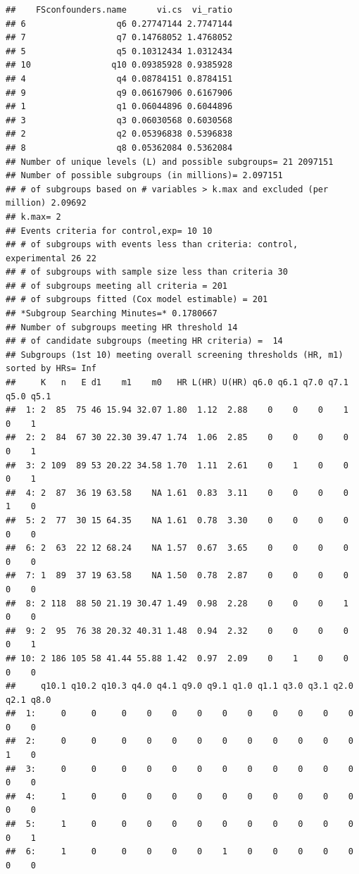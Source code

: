 \documentclass[smallextended]{svjour3}
\makeatletter
\newenvironment{kframe}{%
 \def\at@end@of@kframe{}%
 \ifinner\ifhmode%
  \def\at@end@of@kframe{\end{minipage}}%
  \begin{minipage}{\columnwidth}%
 \fi\fi%
 \def\FrameCommand##1{\hskip\@totalleftmargin \hskip-\fboxsep
 \colorbox{shadecolor}{##1}\hskip-\fboxsep
     \hskip-\linewidth \hskip-\@totalleftmargin \hskip\columnwidth}%
 \MakeFramed {\advance\hsize-\width
   \@totalleftmargin\z@ \linewidth\hsize
   \@setminipage}}%
 {\par\unskip\endMakeFramed%
 \at@end@of@kframe}
\newenvironment{knitrout}{}{} %
\makeatother
\begin{document}
\begin{knitrout}
\begin{kframe}
\begin{verbatim}
##    FSconfounders.name      vi.cs  vi_ratio
## 6                  q6 0.27747144 2.7747144
## 7                  q7 0.14768052 1.4768052
## 5                  q5 0.10312434 1.0312434
## 10                q10 0.09385928 0.9385928
## 4                  q4 0.08784151 0.8784151
## 9                  q9 0.06167906 0.6167906
## 1                  q1 0.06044896 0.6044896
## 3                  q3 0.06030568 0.6030568
## 2                  q2 0.05396838 0.5396838
## 8                  q8 0.05362084 0.5362084
## Number of unique levels (L) and possible subgroups= 21 2097151 
## Number of possible subgroups (in millions)= 2.097151 
## # of subgroups based on # variables > k.max and excluded (per million) 2.09692 
## k.max= 2 
## Events criteria for control,exp= 10 10 
## # of subgroups with events less than criteria: control, experimental 26 22 
## # of subgroups with sample size less than criteria 30 
## # of subgroups meeting all criteria = 201 
## # of subgroups fitted (Cox model estimable) = 201 
## *Subgroup Searching Minutes=* 0.1780667 
## Number of subgroups meeting HR threshold 14 
## # of candidate subgroups (meeting HR criteria) =  14 
## Subgroups (1st 10) meeting overall screening thresholds (HR, m1) sorted by HRs= Inf 
##     K   n   E d1    m1    m0   HR L(HR) U(HR) q6.0 q6.1 q7.0 q7.1 q5.0 q5.1
##  1: 2  85  75 46 15.94 32.07 1.80  1.12  2.88    0    0    0    1    0    1
##  2: 2  84  67 30 22.30 39.47 1.74  1.06  2.85    0    0    0    0    0    1
##  3: 2 109  89 53 20.22 34.58 1.70  1.11  2.61    0    1    0    0    0    1
##  4: 2  87  36 19 63.58    NA 1.61  0.83  3.11    0    0    0    0    1    0
##  5: 2  77  30 15 64.35    NA 1.61  0.78  3.30    0    0    0    0    0    0
##  6: 2  63  22 12 68.24    NA 1.57  0.67  3.65    0    0    0    0    0    0
##  7: 1  89  37 19 63.58    NA 1.50  0.78  2.87    0    0    0    0    0    0
##  8: 2 118  88 50 21.19 30.47 1.49  0.98  2.28    0    0    0    1    0    0
##  9: 2  95  76 38 20.32 40.31 1.48  0.94  2.32    0    0    0    0    0    1
## 10: 2 186 105 58 41.44 55.88 1.42  0.97  2.09    0    1    0    0    0    0
##     q10.1 q10.2 q10.3 q4.0 q4.1 q9.0 q9.1 q1.0 q1.1 q3.0 q3.1 q2.0 q2.1 q8.0
##  1:     0     0     0    0    0    0    0    0    0    0    0    0    0    0
##  2:     0     0     0    0    0    0    0    0    0    0    0    0    1    0
##  3:     0     0     0    0    0    0    0    0    0    0    0    0    0    0
##  4:     1     0     0    0    0    0    0    0    0    0    0    0    0    0
##  5:     1     0     0    0    0    0    0    0    0    0    0    0    0    1
##  6:     1     0     0    0    0    0    1    0    0    0    0    0    0    0

\end{verbatim}
\end{kframe}
\end{knitrout}
\end{document}
